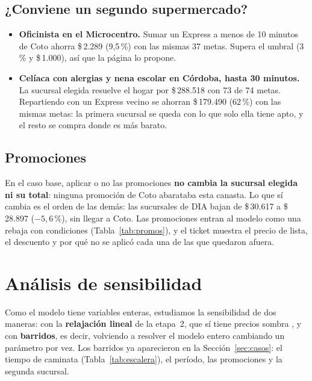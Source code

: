 \documentclass[10pt,a4paper]{article}
\newcommand{\pesos}[1]{\$\,#1}
\begin{document}
\subsection{¿Conviene un segundo supermercado?}

\begin{itemize}
  \item \textbf{Oficinista en el Microcentro.} Sumar un Express a menos de 10 minutos
        de Coto ahorra \pesos{2.289} (9,5\,\%) con las mismas 37 metas. Supera el
        umbral (3\,\% y \pesos{1.000}), así que la página lo propone.
  \item \textbf{Celíaca con alergias y nena escolar en Córdoba, hasta 30 minutos.} La
        sucursal elegida resuelve el hogar por \pesos{288.518} con 73 de 74 metas.
        Repartiendo con un Express vecino se ahorran \pesos{179.490} (62\,\%) con las
        mismas metas: la primera sucursal se queda con lo que solo ella tiene apto, y
        el resto se compra donde es más barato.
\end{itemize}

\subsection{Promociones}

En el caso base, aplicar o no las promociones \textbf{no cambia la sucursal elegida
ni su total}: ninguna promoción de Coto abarataba esta canasta. Lo que sí cambia es
el orden de las demás: las sucursales de DIA bajan de \pesos{30.617} a \pesos{28.897}
($-5{,}6\,\%$), sin llegar a Coto. Las promociones entran al modelo como una rebaja
con condiciones (Tabla~\ref{tab:promos}), y el ticket muestra el precio de lista, el
descuento y por qué no se aplicó cada una de las que quedaron afuera.

\section{Análisis de sensibilidad}
\label{sec:sensibilidad}

Como el modelo tiene variables enteras, estudiamos la sensibilidad de dos maneras:
con la \textbf{relajación lineal} de la etapa~2, que sí tiene precios sombra
\cite{clase-sens}, y con \textbf{barridos}, es decir, volviendo a resolver el modelo
entero cambiando un parámetro por vez. Los barridos ya aparecieron en la
Sección~\ref{sec:casos}: el tiempo de caminata (Tabla~\ref{tab:escalera}), el
período, las promociones y la segunda sucursal.
\end{document}

